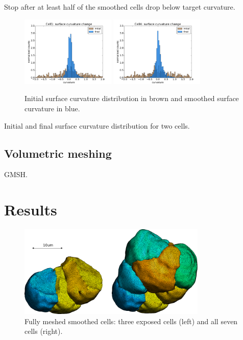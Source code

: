 \documentclass[a4paper,10pt]{article}
\begin{document}
Stop after at least half of the smoothed cells drop below target curvature.\\

\begin{figure}[H]
\begin{center}
\includegraphics[width=0.4\textwidth]{images/cell1_curv_morph.pdf}
\includegraphics[width=0.4\textwidth]{images/cell4_curv_morph.pdf}
\end{center}
\caption{Initial surface curvature distribution in brown and smoothed surface curvature in blue.}
\label{fig:morph_histogram}
\end{figure}

Initial and final surface curvature distribution for two cells.
 
\subsection{Volumetric meshing}

GMSH.\\

\section{Results}

\begin{figure}[H]
\begin{center}
\includegraphics[width=0.8\textwidth]{images/smooth.pdf}
\end{center}
\caption{Fully meshed smoothed cells: three exposed cells (left) and all seven cells (right).}
\label{fig:smooth}
\end{figure}
\end{document}

